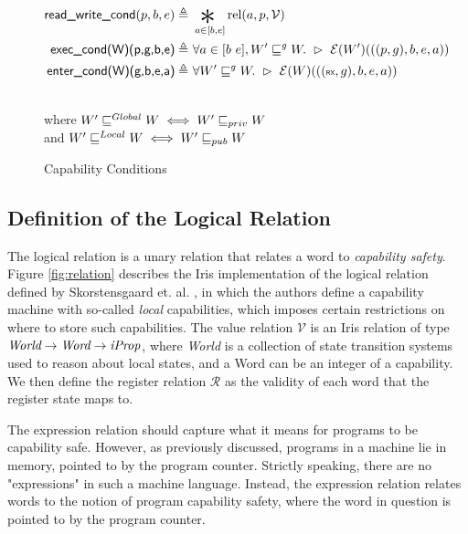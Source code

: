 \documentclass[sigplan,review]{acmart}\settopmatter{printfolios=true,printccs=false,printacmref=false}
\newcommand{\bigsep}{\mathop{\scalebox{2.5}{\raisebox{-0.4ex}{$*$}}}}%
\newcommand{\interp}[2]{(#1)(#2)}
\def\world{\emph{World}}
\def\word{\emph{Word}}
\begin{document}
\begin{figure*}[ht]
	\begin{minipage}{\textwidth}
	\begin{align*}
 		\textsf{read\_write\_cond}(p,b,e) \triangleq&~\bigsep_{a \in [b,e]} \text{rel}(a,p,\mathcal{V})\\
 		\textsf{exec\_cond(W)(p,g,b,e)} \triangleq&~\forall a \in [b~e], W' \sqsubseteq^g W.~\rhd~\mathcal{E}\interp{W'}{((p,g),b,e,a)}\\
 		\textsf{enter\_cond(W)(g,b,e,a)} \triangleq&~\forall W' \sqsubseteq^g W.~\rhd~\mathcal{E}\interp{W}{((\textsf{\tiny{RX}},g),b,e,a)}
	\end{align*}
	\end{minipage}
	\\[2em]
	where $W' \sqsubseteq^{\tiny Global} W \iff W' \sqsubseteq_{priv} W$\\ and 
	$W' \sqsubseteq^{\tiny Local} W \iff W' \sqsubseteq_{pub} W$	
	
	\caption{Capability Conditions}
	\label{fig:condition}
\end{figure*}

\subsection{Definition of the Logical Relation}
The logical relation is a unary relation that relates a word to  \textit{capability safety}. Figure \ref{fig:relation} describes the Iris implementation of the logical relation defined by Skorstensgaard et. al. \cite{skorstengaardESOP18}, in which the authors define a capability machine with so-called \emph{local} capabilities, which imposes certain restrictions on where to store such capabilities. The value relation $\mathcal{V}$ is an Iris relation of type $\world \to \word \to \emph{iProp}$, where \world{} is a collection of state transition systems used to reason about local states, and a Word can be an integer of a capability. We then define the register relation $\mathcal{R}$ as the validity of each word that the register state maps to. 

The expression relation should capture what it means for programs to be capability safe. However, as previously discussed, programs in a machine lie in memory, pointed to by the program counter. Strictly speaking, there are no "expressions" in such a machine language. Instead, the expression relation relates words to the notion of program capability safety, where the word in question is pointed to by the program counter.
\end{document}
